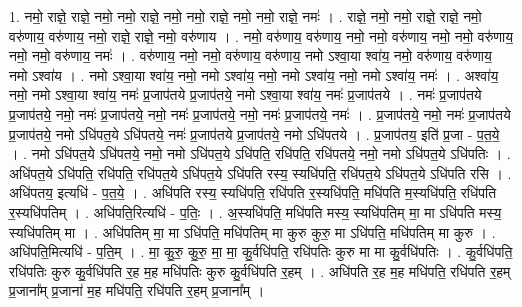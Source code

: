 \documentclass[17pt]{extarticle}
\begin{document}
1. नमो॒ राज्ञे॒ राज्ञे॒ नमो॒ नमो॒ राज्ञे॒ नमो॒ नमो॒ राज्ञे॒ नमो॒ नमो॒ राज्ञे॒ नमः॑ । . राज्ञे॒ नमो॒ नमो॒ राज्ञे॒ राज्ञे॒ नमो॒ वरु॑णाय॒ वरु॑णाय॒ नमो॒ राज्ञे॒ राज्ञे॒ नमो॒ वरु॑णाय । . नमो॒ वरु॑णाय॒ वरु॑णाय॒ नमो॒ नमो॒ वरु॑णाय॒ नमो॒ नमो॒ वरु॑णाय॒ नमो॒ नमो॒ वरु॑णाय॒ नमः॑ । . वरु॑णाय॒ नमो॒ नमो॒ वरु॑णाय॒ वरु॑णाय॒ नमो ऽश्वा॒या श्वा॑य॒ नमो॒ वरु॑णाय॒ वरु॑णाय॒ नमो ऽश्वा॑य । . नमो ऽश्वा॒या श्वा॑य॒ नमो॒ नमो ऽश्वा॑य॒ नमो॒ नमो ऽश्वा॑य॒ नमो॒ नमो ऽश्वा॑य॒ नमः॑ । . अश्वा॑य॒ नमो॒ नमो ऽश्वा॒या श्वा॑य॒ नमः॑ प्र॒जाप॑तये प्र॒जाप॑तये॒ नमो ऽश्वा॒या श्वा॑य॒ नमः॑ प्र॒जाप॑तये । . नमः॑ प्र॒जाप॑तये प्र॒जाप॑तये॒ नमो॒ नमः॑ प्र॒जाप॑तये॒ नमो॒ नमः॑ प्र॒जाप॑तये॒ नमो॒ नमः॑ प्र॒जाप॑तये॒ नमः॑ । . प्र॒जाप॑तये॒ नमो॒ नमः॑ प्र॒जाप॑तये प्र॒जाप॑तये॒ नमो ऽधि॑पत॒ये ऽधि॑पतये॒ नमः॑ प्र॒जाप॑तये प्र॒जाप॑तये॒ नमो ऽधि॑पतये । . प्र॒जाप॑तय॒ इति॑ प्र॒जा - प॒त॒ये॒ । . नमो ऽधि॑पत॒ये ऽधि॑पतये॒ नमो॒ नमो ऽधि॑पत॒ये ऽधि॑पति॒ रधि॑पति॒ रधि॑पतये॒ नमो॒ नमो ऽधि॑पत॒ये ऽधि॑पतिः । . अधि॑पत॒ये ऽधि॑पति॒ रधि॑पति॒ रधि॑पत॒ये ऽधि॑पत॒ये ऽधि॑पति रस्य॒ स्यधि॑पति॒ रधि॑पत॒ये ऽधि॑पत॒ये ऽधि॑पति रसि । . अधि॑पतय॒ इत्यधि॑ - प॒त॒ये॒ । . अधि॑पति रस्य॒ स्यधि॑पति॒ रधि॑पति र॒स्यधि॑पति॒ मधि॑पति म॒स्यधि॑पति॒ रधि॑पति र॒स्यधि॑पतिम् । . अधि॑पति॒रित्यधि॑ - प॒तिः॒ । . अ॒स्यधि॑पति॒ मधि॑पति मस्य॒ स्यधि॑पतिम् मा॒ मा ऽधि॑पति मस्य॒ स्यधि॑पतिम् मा । . अधि॑पतिम् मा॒ मा ऽधि॑पति॒ मधि॑पतिम् मा कुरु कुरु॒ मा ऽधि॑पति॒ मधि॑पतिम् मा कुरु । . अधि॑पति॒मित्यधि॑ - प॒ति॒म् । . मा॒ कु॒रु॒ कु॒रु॒ मा॒ मा॒ कु॒र्वधि॑पति॒ रधि॑पतिः कुरु मा मा कु॒र्वधि॑पतिः । . कु॒र्वधि॑पति॒ रधि॑पतिः कुरु कु॒र्वधि॑पति र॒ह म॒ह मधि॑पतिः कुरु कु॒र्वधि॑पति र॒हम् । . अधि॑पति र॒ह म॒ह मधि॑पति॒ रधि॑पति र॒हम् प्र॒जाना᳚म् प्र॒जाना॑ म॒ह मधि॑पति॒ रधि॑पति र॒हम् प्र॒जाना᳚म् । \newline
\end{document}
